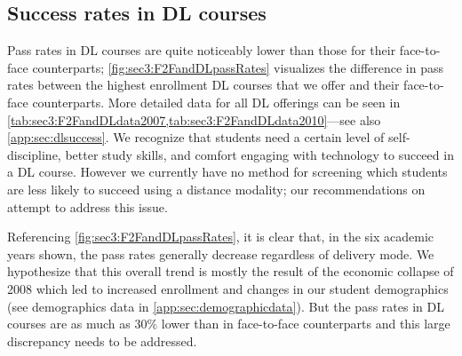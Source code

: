 \subsection{Success rates in DL courses}
Pass rates in DL courses are quite noticeably lower than those for their
face-to-face counterparts; \cref{fig:sec3:F2FandDLpassRates} visualizes the
difference in pass rates between the highest enrollment DL courses that we offer
and their face-to-face counterparts. More detailed data for all DL offerings can
be seen in \cref{tab:sec3:F2FandDLdata2007,tab:sec3:F2FandDLdata2010}---see also
\vref{app:sec:dlsuccess}. We recognize that students need a
certain level of self-discipline, better study skills, and comfort engaging with
technology to succeed in a DL course. However we currently have no method for
screening which students are less likely to succeed using a distance modality;
our recommendations on  attempt to address this issue.


Referencing \cref{fig:sec3:F2FandDLpassRates}, 
it is clear that, in the six academic years shown, the pass rates 
generally decrease regardless of delivery mode.  We hypothesize that this
overall trend is mostly the result of the economic collapse of 2008 which led to
increased enrollment and changes in our student demographics (see demographics
data in \vref{app:sec:demographicdata}).  But the pass rates in DL courses are
as much as 30\% lower than in face-to-face counterparts and this large
discrepancy needs to be addressed.

